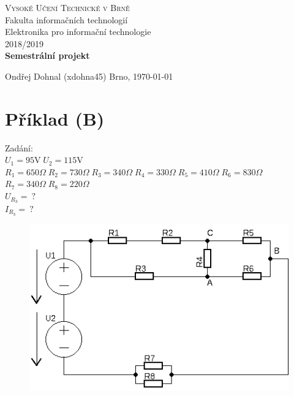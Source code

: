 \documentclass[12pt,a4paper]{article}
\begin{document}
	\begin{titlepage}
		\begin{center}
			\textsc{\LARGE Vysoké Učení Technické v Brně}\\[0.5cm]
			{\LARGE Fakulta informačních technologií }\\[4.0cm]

			\LARGE Elektronika pro informační  technologie\\[0.5cm]
			\textsc{\LARGE 2018/2019}\\[5cm]

			
			\textbf{\LARGE Semestrální projekt}
			\end{center}

			\vfill

			\begin{flushleft} 
				\large
				Ondřej Dohnal (xdohna45)
				\hfill
				Brno, \today
			\end{flushleft}
	\end{titlepage}
\section{Příklad (B)}
{\Large Zadání:} \\
	$U_1 = 95 \text{V} \; U_2=115 \text{V}$ \\
	$R_1 = 650 \Omega \; R_2 = 730 \Omega \; R_3 = 340 \Omega \;
	R_4 = 330 \Omega \; R_5 = 410 \Omega \; R_6 =830 \Omega$ \\
	$R_7 = 340 \Omega \; R_8 = 220 \Omega$\\
	$U_{R_3} = \: \text{?}$ \\
	$I_{R_3} = \: \text{?}$ \\

\begin{figure}[H] 
		\center\includegraphics[width=0.6\linewidth]{img0.png}
\end{figure}
	
\end{document}
